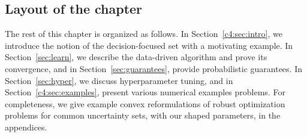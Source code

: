 
\subsection{Layout of the chapter}%
The rest of this chapter is organized as follows.
In Section~\ref{c4:sec:intro}, we introduce the notion of the decision-focused set with a motivating example. In Section~\ref{sec:learn}, we describe the data-driven algorithm and prove its convergence, and in Section~\ref{sec:guarantees}, provide probabilistic guarantees.
In Section~\ref{sec:hyper}, we discuss hyperparameter tuning, and in Section~\ref{c4:sec:examples}, present various numerical examples problems.
For completeness, we give example convex reformulations of robust optimization problems for common uncertainty sets, with our shaped parameters, in the appendices.

